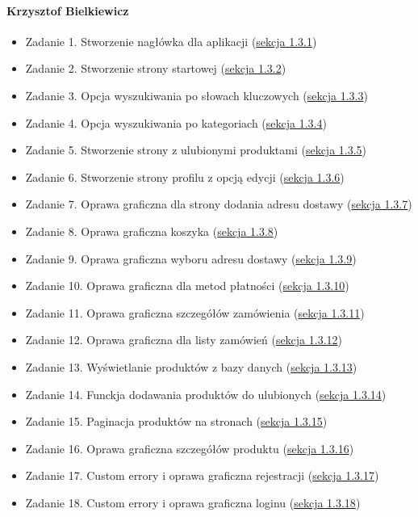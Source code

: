 \documentclass[12pt,a4paper,oneside]{article}
\theoremstyle{definition}
\numberwithin{equation}{section}
\begin{document}
\paragraph{Krzysztof Bielkiewicz}
\begin{itemize}
    \item Zadanie 1. Stworzenie nagłówka dla aplikacji (\hyperref[1.3.1]{sekcja 1.3.1})
    \item Zadanie 2. Stworzenie strony startowej (\hyperref[1.3.2]{sekcja 1.3.2})
    \item Zadanie 3. Opcja wyszukiwania po słowach kluczowych (\hyperref[1.3.3]{sekcja 1.3.3})
    \item Zadanie 4. Opcja wyszukiwania po kategoriach (\hyperref[1.3.4]{sekcja 1.3.4})
    \item Zadanie 5. Stworzenie strony z ulubionymi produktami (\hyperref[1.3.5]{sekcja 1.3.5})
    \item Zadanie 6. Stworzenie strony profilu z opcją edycji (\hyperref[1.3.6]{sekcja 1.3.6})
    \item Zadanie 7. Oprawa graficzna dla strony dodania adresu dostawy (\hyperref[1.3.7]{sekcja 1.3.7})
    \item Zadanie 8. Oprawa graficzna koszyka (\hyperref[1.3.8]{sekcja 1.3.8})
    \item Zadanie 9. Oprawa graficzna wyboru adresu dostawy (\hyperref[1.3.9]{sekcja 1.3.9})
    \item Zadanie 10. Oprawa graficzna dla metod płatności (\hyperref[1.3.10]{sekcja 1.3.10})
    \item Zadanie 11. Oprawa graficzna szczegółów zamówienia (\hyperref[1.3.11]{sekcja 1.3.11})
    \item Zadanie 12. Oprawa graficzna dla listy zamówień (\hyperref[1.3.12]{sekcja 1.3.12})
    \item Zadanie 13. Wyświetlanie produktów z bazy danych (\hyperref[1.3.13]{sekcja 1.3.13})
    \item Zadanie 14. Funckja dodawania produktów do ulubionych (\hyperref[1.3.14]{sekcja 1.3.14})
    \item Zadanie 15. Paginacja produktów na stronach (\hyperref[1.3.15]{sekcja 1.3.15})
    \item Zadanie 16. Oprawa graficzna szczegółów produktu (\hyperref[1.3.16]{sekcja 1.3.16})
    \item Zadanie 17. Custom errory i oprawa graficzna rejestracji (\hyperref[1.3.17]{sekcja 1.3.17})
    \item Zadanie 18. Custom errory i oprawa graficzna loginu (\hyperref[1.3.18]{sekcja 1.3.18})
\end{itemize}
\end{document}
